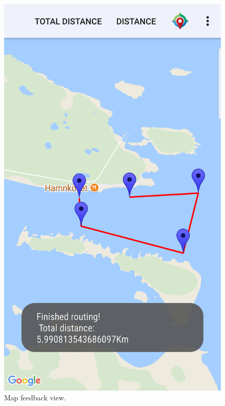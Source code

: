 \begin{figure}[H]
\begin{minipage}[c]{0.35\textwidth}
	\includegraphics[width=\textwidth]{Figures/map.png}
	\caption{Map feedback view.}
	\label{feedback-map}
	\end{minipage}
\end{figure}
